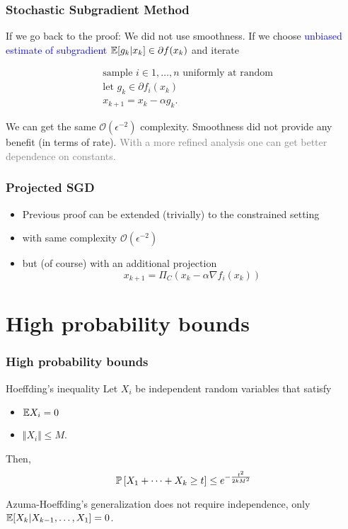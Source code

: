 \documentclass[aspectratio=149]{beamer}
\begin{document}
\begin{frame}
  \frametitle{Stochastic Subgradient Method}
  If we go back to the proof: We did not use smoothness. If we choose \textcolor{blue}{unbiased estimate of subgradient} $\E[g_k|x_k] \in \partial f(x_k)$ and iterate
  \begin{block}{}
    \begin{align}
      &\text{sample $i\in 1,\dots, n$ uniformly at random} \\
      &\text{let $g_k \in \partial f_i(x_k)$}\\
      &x_{k+1} = x_k - \alpha g_k.
    \end{align}
  \end{block}
  We can get the same $\mathcal{O}(\epsilon^{-2})$ complexity. Smoothness did not provide any benefit (in terms of rate).
  \textcolor{gray}{With a more refined analysis one can get better dependence on constants.}

\end{frame}


\begin{frame}
  \frametitle{Projected SGD}

  \begin{itemize}
    \item Previous proof can be extended (trivially) to the constrained setting
    \item with same complexity $\mathcal{O}(\epsilon^{-2})$
    \item but (of course) with an additional projection
          \begin{equation}
            x_{k+1} = \Pi_C(x_k - \alpha \nabla f_i (x_k))
          \end{equation}
  \end{itemize}


\end{frame}

\section{High probability bounds}%
\label{sec:}

\begin{frame}
  \frametitle{High probability bounds}

  \begin{theorem}{Hoeffding's inequality}
    Let $X_i$ be independent random variables that satisfy
    \begin{itemize}
      \item $\E X_i = 0$
      \item $\Vert X_i \Vert \le M$.
    \end{itemize}
    Then,
    \begin{equation}
      \P\left[ X_1+ \dots + X_k \ge t\right] \le e^{-\frac{t^2}{2kM^2}}
    \end{equation}
  \end{theorem}

  Azuma-Hoeffding's generalization does not require independence, only $\E[X_k| X_{k-1}, \dots, X_1]=0$.
\end{frame}
\end{document}
